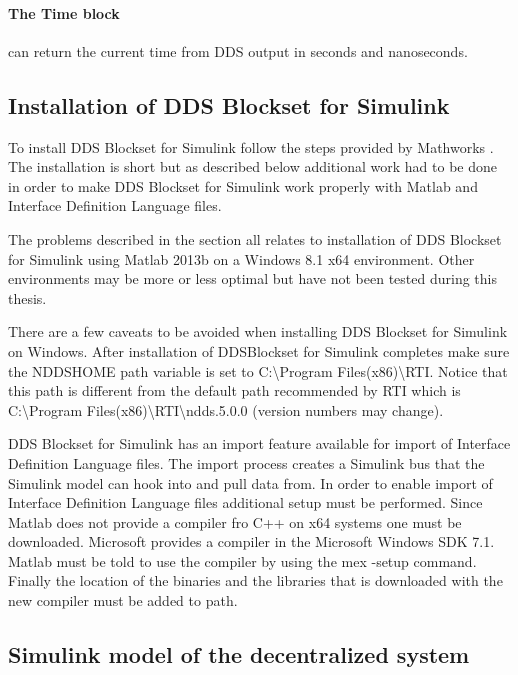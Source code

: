\paragraph{The Time block} can return the current time from DDS output in seconds and nanoseconds.

\subsection{Installation of DDS Blockset for Simulink}
To install DDS Blockset for Simulink follow the steps provided by Mathworks \cite{DDSBlocksetPilotSupportPackageUserGuide}. The installation is short but as described below additional work had to be done in order to make DDS Blockset for Simulink work properly with Matlab and Interface Definition Language files.

The problems described in the section all relates to installation of DDS Blockset for Simulink using Matlab 2013b on a Windows 8.1 x64 environment.
Other environments may be more or less optimal but have not been tested during this thesis.

There are a few caveats to be avoided when installing DDS Blockset for Simulink on Windows.
After installation of DDSBlockset for Simulink completes make sure the NDDSHOME path variable is set to C:\textbackslash Program Files(x86)\textbackslash RTI.
Notice that this path is different from the default path recommended by RTI which is C:\textbackslash Program Files(x86)\textbackslash RTI\textbackslash ndds.5.0.0 (version numbers may change).

DDS Blockset for Simulink has an import feature available for import of Interface Definition Language files. The import process creates a Simulink bus that the Simulink model can hook into and pull data from. In order to enable import of Interface Definition Language files additional setup must be performed.
Since Matlab does not provide a compiler fro C++ on x64 systems one must be downloaded. Microsoft provides a compiler in the Microsoft Windows SDK 7.1. Matlab must be told to use the compiler by using the mex -setup command. Finally the location of the binaries and the libraries that is downloaded with the new compiler must be added to path.

\subsection{Simulink model of the decentralized system}\label{subsec:decentralizedmodel}

